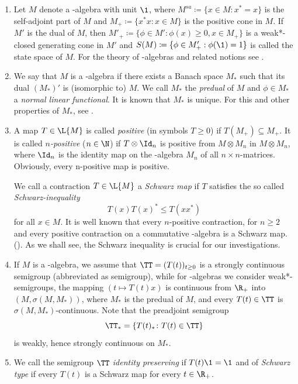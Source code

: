 \begin{enumerate}[1., wide, labelsep=1em]

\item
Let $ M $ denote a \CA-algebra with unit $ \1 $, where 
%
$
	M^{sa} \coloneqq \{x \in M \colon x^{*} = x\} 
$
%
is the self-adjoint part of\/ $ M $ and 
%
$
	M_{+} \coloneqq \{ x^{*}x \colon x \in M\} 
$
%
is the positive cone in $ M $.
If\/ $ M' $ is the dual of\/ $ M $, then 
%
$
	M'_{+} \coloneqq \{\phi \in M' \colon \phi(x) \geq 0, x \in M_{+}\} 
$
%
is a weak*-closed generating cone in $ M' $ and 
%
$
	S(M) \coloneqq \{\phi \in M'_{+}: \phi(\1) = 1\} 
$
%
is called the state space of\/ $ M $. 
For the theory of \CA-algebras and related notions see \textcite{pedersen:1979}.

\item
We say that $ M $ is a \WA-algebra if there exists a Banach space $ M_{*} $ such that its dual $ (M_{*})' $ is (isomorphic to) $ M $.
We call $ M_{*} $ the \emph{predual} of\/ $ M $ and $ \phi \in M_{*} $ a \emph{normal linear functional}.
It is known that $ M_{*} $ is unique. %
For this and other properties of\/ $M_{*} $, see \textcite[Chapter III]{takesaki:1979}.

\item
A map $ T \in \L{M} $ is called \emph{positive} (in symbols $ T \geq 0 $) if\/ $ T(M_{+}) \subseteq M_{+} $.
It is called \emph{$n$-positive} ($ n \in \N $) if\/ $ T \otimes \Id _{n} $ is positive from $ M \otimes M_{n} $ in $ M \otimes M_{n} $, where $ \Id _{n} $ is the identity map on the \CA-algebra $ M_{n} $ of all $ n \times n $-matrices.
Obviously, every n-positive map is positive.

We call a contraction $ T \in \L{M} $ a \emph{Schwarz map} if\/ $ T $ satisfies the so called \emph{Schwarz-inequality}
\[
	T(x)T(x)^{*} \leq T(xx^{*}) 
\]
for all $ x \in M $.
It is well known that every $n$-positive contraction, for $ n \geq 2 $ and every positive contraction on a commutative \CA-algebra is a Schwarz map. (\textcite[Chapter IV]{takesaki:1979}).%
As we shall see, the Schwarz inequality is crucial for our investigations.

\item 
If\/ $ M $ is a \CA-algebra, we assume that $ \TT = (T(t))_{t \geq 0} $ is a strongly continuous semigroup (abbreviated as semigroup), while for \WA-algebras we consider weak*-semigroups, \ie the mapping $ (t \mapsto T(t)x) $ is continuous from $ \R_{+} $ into $ (M,\sigma(M,M_{*}))$, where $ M_{*} $ is the predual of\/ $ M $, and every $ T(t) \in \TT $ is $ \sigma(M,M_{*}) $-continuous.
Note that the preadjoint semigroup
\[
	\TT_{*} = \{ T(t)_{*} \colon T(t) \in \TT \}
\]
is weakly, hence strongly continuous on $ M_{*} $. %

\item
We call the semigroup $ \TT $ \emph{identity preserving} if\/ $ T(t)\1 = \1 $ and of \emph{Schwarz type} if every $ T(t) $ is a Schwarz map for every $t \in \R_{+}$.

\end{enumerate}
